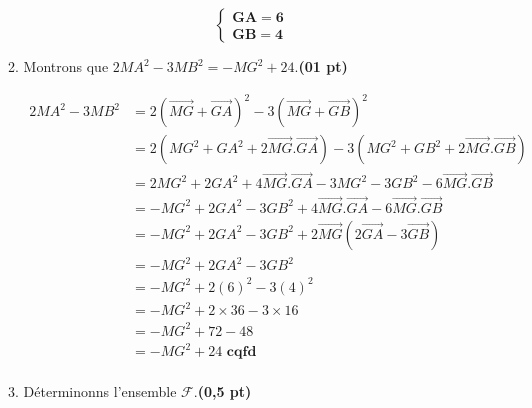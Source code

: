 \documentclass[12pt,a4paper]{article}
\begin{document}
\begin{enumerate}
\begin{enumerate}
                    \begin{resultbox}
                        \[
                            \mathbf{ \begin{cases}
                                    GA = 6 \\
                                    GB = 4
                                \end{cases}}
                        \]
                    \end{resultbox}

              \item Montrons que \( 2MA^2 - 3MB^2 = -MG^2 + 24 \).\hfill \textbf{(01 pt)}

                    \(
                    \begin{aligned}
                        2MA^2 - 3MB^2 & = 2(\overrightarrow{MG}+\overrightarrow{GA})^2 - 3(\overrightarrow{MG}+\overrightarrow{GB})^2                          \\
                                      & =2(MG^{2}+GA^{2}+2\overrightarrow{MG}.\overrightarrow{GA}) - 3(MG^{2}+GB^{2}+2\overrightarrow{MG}.\overrightarrow{GB}) \\
                                      & =2MG^{2}+2GA^{2}+4\overrightarrow{MG}.\overrightarrow{GA} - 3MG^{2}-3GB^{2}-6\overrightarrow{MG}.\overrightarrow{GB}   \\
                                      & =-MG^{2}+2GA^{2} -3GB^{2}+4\overrightarrow{MG}.\overrightarrow{GA}-6\overrightarrow{MG}.\overrightarrow{GB}            \\
                                      & =-MG^{2}+2GA^{2} -3GB^{2}+2\overrightarrow{MG}(2\overrightarrow{GA}-3\overrightarrow{GB})                              \\
                                      & =-MG^{2}+2GA^{2} -3GB^{2}                                                                                              \\
                                      & =-MG^{2}+2(6)^{2} -3(4)^{2}                                                                                            \\
                                      & =-MG^{2}+2\times36 -3\times16                                                                                          \\
                                      & =-MG^{2}+72 -48                                                                                                        \\
                                      & =-MG^{2}+24 \textbf{ cqfd}                                                                                             \\
                    \end{aligned}
                    \)
              \item Déterminonns l’ensemble \( \mathcal{F} \).\hfill \textbf{(0,5 pt)}


\end{enumerate}
\end{enumerate}
\end{document}
